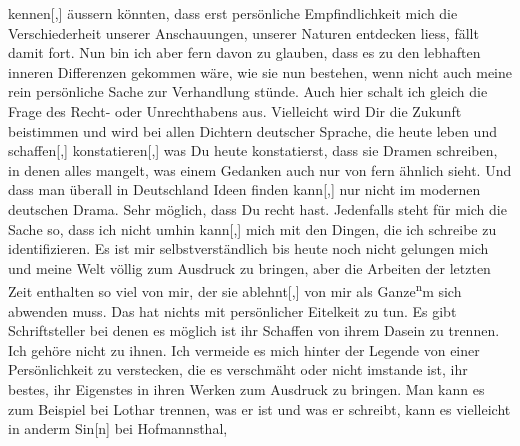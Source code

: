                   kennen{[},{]} äussern könnten, dass erst persönliche
               Empfindlichkeit mich die Verschiederheit unserer Anschauungen\introOben{},\introOben{} unserer Naturen entdecken liess, fällt damit fort. Nun bin ich aber fern
               davon zu glauben, dass es zu den lebhaften inneren Differenzen gekommen wäre, wie sie
               nun bestehen, wenn nicht auch meine rein persönliche Sache zur Verhandlung stünde.
               Auch hier schalt ich gleich die Frage des Recht- oder Unrechthabens aus. Vielleicht
               wird Dir die Zukunft beistimmen und wird bei allen Dichtern deutscher Sprache, die
               heute leben und schaffen{[},{]} konstatieren{[},{]} was
               Du heute konstatierst, dass sie Dramen schreiben, in denen alles mangelt, {\pb}was einem Gedanken auch nur von fern
               ähnlich sieht. Und dass man überall in Deutschland Ideen finden kann{[},{]} nur nicht im modernen
               deutschen Drama. Sehr möglich, dass Du recht hast. Jedenfalls steht für mich die
               Sache so, dass ich nicht umhin kann{[},{]} mich mit den Dingen, die
               ich schreibe zu identifizieren. Es ist mir selbstverständlich bis heute noch nicht
               gelungen mich und meine Welt völlig zum Ausdruck zu bringen, aber die Arbeit\introOben{}en\introOben{} der letzten Zeit enthalten so viel von mir, \label{T_L03520-4v}\label{T_L03520-4} der sie
                  ablehnt{[},{]} von mir als Ganze\substVorne{}\textsuperscript{n}\substDazwischen{}m\substHinten{} sich abwenden muss. Das hat nichts mit persönlicher Eitelkeit zu tun. Es
               gibt Schriftsteller bei denen es möglich ist ihr Schaffen von ihrem Dasein zu
               trennen. Ich gehöre nicht zu ihnen. Ich vermeide es mich hinter der Legende von einer
               Persönlichkeit zu verstecken, die es verschmäht oder nicht imstande ist, ihr bestes,
               ihr Eigenstes in ihren Werken zum Ausdruck zu bringen. Man kann es zum Beispiel {\pb}bei Lothar trennen, was er ist und was er schreibt, kann es vielleicht in anderm
                  Sin{[}n{]} bei Hofmannsthal,
